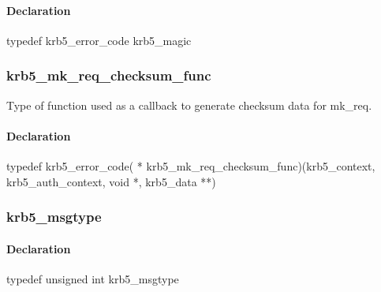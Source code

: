 \documentclass[letterpaper,10pt,english]{sphinxmanual}
\begin{document}
\paragraph{Declaration}
\label{appdev/refs/types/krb5_magic:declaration}
typedef krb5\_error\_code krb5\_magic


\subsubsection{krb5\_mk\_req\_checksum\_func}
\label{appdev/refs/types/krb5_mk_req_checksum_func:krb5-mk-req-checksum-func-struct}\label{appdev/refs/types/krb5_mk_req_checksum_func::doc}\label{appdev/refs/types/krb5_mk_req_checksum_func:krb5-mk-req-checksum-func}

\begin{fulllineitems}
\label{appdev/refs/types/krb5_mk_req_checksum_func:c.krb5_mk_req_checksum_func}
\end{fulllineitems}


Type of function used as a callback to generate checksum data for mk\_req.


\paragraph{Declaration}
\label{appdev/refs/types/krb5_mk_req_checksum_func:declaration}
typedef krb5\_error\_code( * krb5\_mk\_req\_checksum\_func)(krb5\_context, krb5\_auth\_context, void *, krb5\_data **)


\subsubsection{krb5\_msgtype}
\label{appdev/refs/types/krb5_msgtype:krb5-msgtype}\label{appdev/refs/types/krb5_msgtype::doc}\label{appdev/refs/types/krb5_msgtype:krb5-msgtype-struct}

\begin{fulllineitems}
\label{appdev/refs/types/krb5_msgtype:c.krb5_msgtype}
\end{fulllineitems}



\paragraph{Declaration}
\label{appdev/refs/types/krb5_msgtype:declaration}
typedef unsigned int krb5\_msgtype
\end{document}
